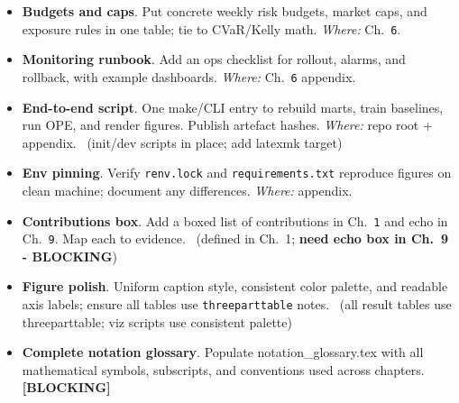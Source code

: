 \begin{itemize}
  \item {} \textbf{Budgets and caps}. Put concrete weekly risk budgets, market caps, and exposure rules in one table; tie to CVaR/Kelly math. \emph{Where:} Ch.~\texttt{6}.
  \item {} \textbf{Monitoring runbook}. Add an ops checklist for rollout, alarms, and rollback, with example dashboards. \emph{Where:} Ch.~\texttt{6} appendix.
\end{itemize}

\begin{itemize}
  \item {} \textbf{End-to-end script}. One make/CLI entry to rebuild marts, train baselines, run OPE, and render figures. Publish artefact hashes. \emph{Where:} repo root + appendix. \wip\ (init/dev scripts in place; add latexmk target)
  \item {} \textbf{Env pinning}. Verify \texttt{renv.lock} and \texttt{requirements.txt} reproduce figures on clean machine; document any differences. \emph{Where:} appendix. \wip
\end{itemize}

\begin{itemize}
  \item {} \textbf{Contributions box}. Add a boxed list of contributions in Ch.~\texttt{1} and echo in Ch.~\texttt{9}. Map each to evidence. \wip\ (defined in Ch.~1; \textbf{need echo box in Ch.~9 - BLOCKING})
  \item {} \textbf{Figure polish}. Uniform caption style, consistent color palette, and readable axis labels; ensure all tables use \texttt{threeparttable} notes. \done\ (all result tables use threeparttable; viz scripts use consistent palette)
  \item {} \textbf{Complete notation glossary}. Populate notation\_glossary.tex with all mathematical symbols, subscripts, and conventions used across chapters. \textbf{[BLOCKING]}
\end{itemize}

